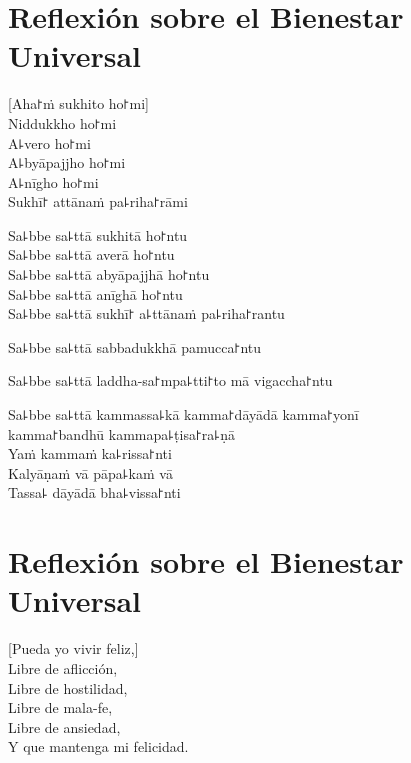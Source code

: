 \chapter*[Bienestar Universal]{Reflexión sobre el Bienestar Universal}

\delegateSetUseNext


\begin{leader}
\end{leader}

[Aha꜓ṁ sukhito ho꜓mi]\\
Niddukkho ho꜓mi\\
A꜕vero ho꜓mi\\
A꜕byāpajjho ho꜓mi\\
A꜕nīgho ho꜓mi\\
Sukhī꜓ attānaṁ pa꜕riha꜓rāmi

Sa꜕bbe sa꜕ttā sukhitā ho꜓ntu\\
Sa꜕bbe sa꜕ttā averā ho꜓ntu\\
Sa꜕bbe sa꜕ttā abyāpajjhā ho꜓ntu\\
Sa꜕bbe sa꜕ttā anīghā ho꜓ntu\\
Sa꜕bbe sa꜕ttā sukhī꜓ a꜕ttānaṁ pa꜕riha꜓rantu

Sa꜕bbe sa꜕ttā sabbadukkhā pamucca꜓ntu

Sa꜕bbe sa꜕ttā laddha-sa꜓mpa꜕tti꜓to mā vigaccha꜓ntu

Sa꜕bbe sa꜕ttā kammassa꜕kā kamma꜓dāyādā kamma꜓yonī\\
\vin kamma꜓bandhū kammapa꜕ṭisa꜓ra꜕ṇā\\
Yaṁ kammaṁ ka꜕rissa꜓nti\\
Kalyāṇaṁ vā pāpa꜕kaṁ vā\\
Tassa꜕ dāyādā bha꜕vissa꜓nti

\chapter[Bienestar Universal]{Reflexión sobre el Bienestar Universal}


\begin{leader}
\end{leader}

[Pueda yo vivir feliz,]\\
Libre de aflicción,\\
Libre de hostilidad,\\
Libre de mala-fe,\\
Libre de ansiedad,\\
Y que mantenga mi felicidad.

